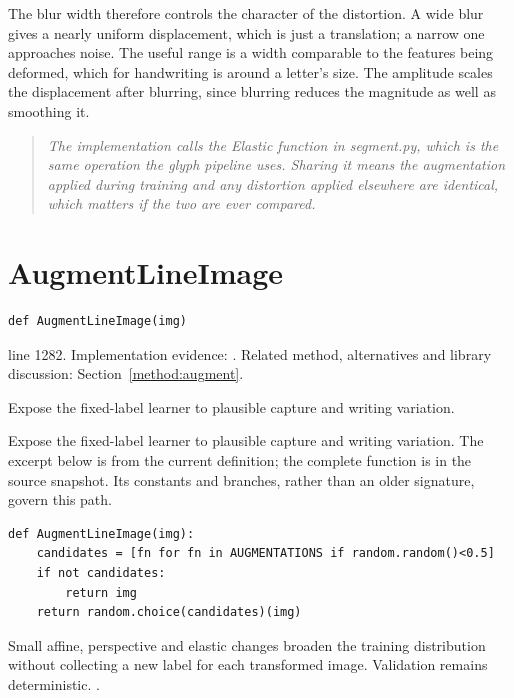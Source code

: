 The blur width therefore controls the character of the distortion. A wide blur gives a nearly uniform displacement, which is just a translation; a narrow one approaches noise. The useful range is a width comparable to the features being deformed, which for handwriting is around a letter's size. The amplitude scales the displacement after blurring, since blurring reduces the magnitude as well as smoothing it.


\begin{quote}\small\itshape The implementation calls the Elastic function in segment.py, which is the same operation the glyph pipeline uses. Sharing it means the augmentation applied during training and any distortion applied elsewhere are identical, which matters if the two are ever compared.\end{quote}


\section{AugmentLineImage}\label{fn:train:AugmentLineImage}
\begin{lstlisting}[style=sig]
def AugmentLineImage(img)
\end{lstlisting}
 line 1282. Implementation evidence: \cite{code2026}. Related method, alternatives and library discussion: Section~\ref{method:augment}.


Expose the fixed-label learner to plausible capture and writing variation.


Expose the fixed-label learner to plausible capture and writing variation. The excerpt below is from the current definition; the complete function is in the source snapshot. Its constants and branches, rather than an older signature, govern this path.


\begin{lstlisting}[style=plain]
def AugmentLineImage(img):
    candidates = [fn for fn in AUGMENTATIONS if random.random()<0.5]
    if not candidates:
        return img
    return random.choice(candidates)(img)
\end{lstlisting}
Small affine, perspective and elastic changes broaden the training distribution without collecting a new label for each transformed image. Validation remains deterministic. \cite{simard2003,wolberg1990,opencvtransform}.


